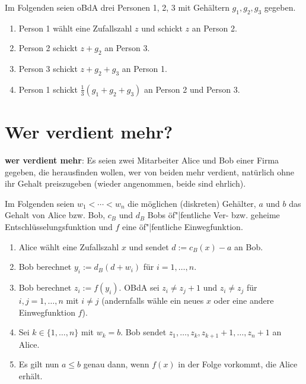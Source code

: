 Im Folgenden seien oBdA drei Personen 1, 2, 3 mit Gehältern $g_1, g_2, g_3$ gegeben.
\begin{enumerate}
    \item
    Person 1 wählt eine Zufallszahl $z$ und schickt $z$ an Person 2.

    \item
    Person 2 schickt $z + g_2$ an Person 3.

    \item
    Person 3 schickt $z + g_2 + g_3$ an Person 1.

    \item
    Person 1 schickt $\frac{1}{3} (g_1 + g_2 + g_3)$ an Person 2 und Person 3.
\end{enumerate}

\section{%
    Wer verdient mehr?%
}

\textbf{wer verdient mehr}:
Es seien zwei Mitarbeiter Alice und Bob einer Firma gegeben,
die herausfinden wollen, wer von beiden mehr
verdient, natürlich ohne ihr Gehalt preiszugeben
(wieder angenommen, beide sind ehrlich).

Im Folgenden seien $w_1 < \dotsb < w_n$ die möglichen (diskreten) Gehälter,
$a$ und $b$ das Gehalt von Alice bzw. Bob,
$c_B$ und $d_B$ Bobs öf"|fentliche Ver- bzw. geheime Entschlüsselungsfunktion
und $f$ eine öf"|fentliche Einwegfunktion.
\begin{enumerate}
    \item
    Alice wählt eine Zufallszahl $x$ und sendet $d := c_B(x) - a$ an Bob.

    \item
    Bob berechnet $y_i := d_B(d + w_i)$ für $i = 1, \dotsc, n$.

    \item
    Bob berechnet $z_i := f(y_i)$.
    OBdA sei $z_i \not= z_j + 1$ und $z_i \not= z_j$
    für $i, j = 1, \dotsc, n$ mit $i \not= j$
    (andernfalls wähle ein neues $x$ oder eine andere Einwegfunktion $f$).

    \item
    Sei $k \in \{1, \dotsc, n\}$ mit $w_k = b$.
    Bob sendet $z_1, \dotsc, z_k, z_{k+1} + 1, \dotsc, z_n + 1$ an Alice.

    \item
    Es gilt nun $a \le b$ genau dann, wenn $f(x)$ in der Folge vorkommt, die Alice erhält.
\end{enumerate}

